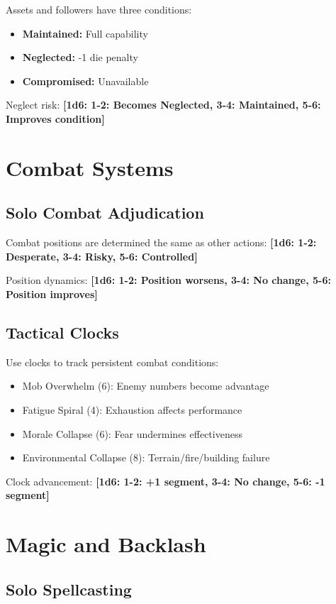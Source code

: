 \documentclass[11pt]{article}
\newcommand{\dice}[1]{\textbf{[1d6: #1]}}
\begin{document}
Assets and followers have three conditions:
\begin{itemize}
    \item \textbf{Maintained:} Full capability
    \item \textbf{Neglected:} -1 die penalty
    \item \textbf{Compromised:} Unavailable
\end{itemize}

Neglect risk:
\dice{1-2: Becomes Neglected, 3-4: Maintained, 5-6: Improves condition}

\section{Combat Systems}

\subsection{Solo Combat Adjudication}

Combat positions are determined the same as other actions:
\dice{1-2: Desperate, 3-4: Risky, 5-6: Controlled}

Position dynamics:
\dice{1-2: Position worsens, 3-4: No change, 5-6: Position improves}

\subsection{Tactical Clocks}

Use clocks to track persistent combat conditions:
\begin{itemize}
    \item Mob Overwhelm (6): Enemy numbers become advantage
    \item Fatigue Spiral (4): Exhaustion affects performance
    \item Morale Collapse (6): Fear undermines effectiveness
    \item Environmental Collapse (8): Terrain/fire/building failure
\end{itemize}

Clock advancement:
\dice{1-2: +1 segment, 3-4: No change, 5-6: -1 segment}

\section{Magic and Backlash}

\subsection{Solo Spellcasting}
\end{document}
